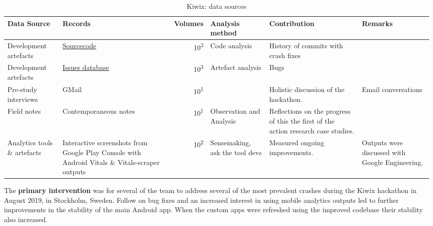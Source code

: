 \begin{table*}
    \centering
    \footnotesize
    \begin{tabular}{>{\raggedright}p{2cm} >{\raggedright}p{3.3cm} r >{\raggedright}p{2.1cm} >{\raggedright}p{2.2cm} >{\raggedright\arraybackslash}p{2.5cm}}
        Data Source & Records & Volumes & Analysis method & Contribution & Remarks \\
        \toprule
         Development artefacts & \href{https://github.com/kiwix/kiwix-android/tree/develop}{Sourcecode} & 10\textsuperscript{3} & Code analysis & History of commits with crash fixes &  \\
         Development artefacts & \href{https://github.com/kiwix/kiwix-android/issues}{Issues database} & 10\textsuperscript{3} & Artefact analysis & Bugs & \\
         Pre-study interviews & GMail & 10\textsuperscript{1} & & Holistic discussion of the hackathon. & Email conversations \\
         Field notes & Contemporaneous notes & 10\textsuperscript{1} & Observation and Analysis & Reflections on the progress of this the first of the action research case studies. & \\
         Analytics tools \& artefacts &Interactive screenshots from Google Play Console with Android Vitals \& Vitals-scraper outputs &10\textsuperscript{2} & Sensemaking, ask the tool devs & Measured ongoing improvements. & Outputs were discussed with Google Engineering. \\
         \bottomrule
    \end{tabular}
    \caption{Kiwix: data sources}
    \label{tab:kiwix-data-sources}
\end{table*}



The \textbf{primary intervention} was for several of the team to address several of the most prevalent crashes during the Kiwix hackathon in August 2019, in Stockholm, Sweden. Follow on bug fixes and an increased interest in using mobile analytics outputs led to further improvements in the stability of the main Android app. When the custom apps were refreshed using the improved codebase their stability also increased.




